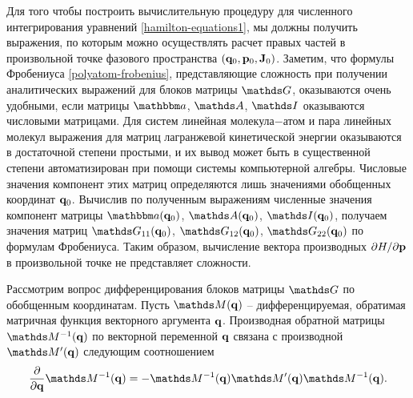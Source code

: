 Для того чтобы построить вычислительную процедуру для численного интегрирования уравнений \eqref{hamilton-equations1}, мы должны получить выражения, по которым можно осуществлять расчет правых частей в произвольной точке фазового пространства $\left( \mathbf{q}_0, \mathbf{p}_0, \mathbf{J}_0 \right)$. Заметим, что формулы Фробениуса \eqref{polyatom-frobenius}, представляющие сложность при получении аналитических выражений для блоков матрицы $\bbG$, оказываются очень удобными, если матрицы $\bba$, $\bbA$, $\bbI$ оказываются числовыми матрицами. Для систем линейная молекула$-$атом и пара линейных молекул выражения для матриц лагранжевой кинетической энергии оказываются в достаточной степени простыми, и их вывод может быть в существенной степени автоматизирован при помощи системы компьютерной алгебры. Числовые значения компонент этих матриц определяются лишь значениями обобщенных координат $\mathbf{q}_0$. Вычислив по полученным выражениям численные значения компонент матрицы $\bba(\mf{q}_0)$, $\bbA(\mf{q}_0)$, $\bbI(\mf{q}_0)$, получаем значения матриц $\bbG_{11}(\mf{q}_0)$, $\bbG_{12}(\mf{q}_0)$, $\bbG_{22}(\mf{q}_0)$ по формулам Фробениуса. Таким образом, вычисление вектора производных $\partial H / \partial \mathbf{p}$ в произвольной точке не представляет сложности. \par
Рассмотрим вопрос дифференцирования блоков матрицы $\bbG$ по обобщенным координатам. Пусть $\bbM(\mf{q})$ -- дифференцируемая, обратимая матричная функция векторного аргумента $\mathbf{q}$. Производная обратной матрицы $\bbM^{-1}(\mf{q})$ по векторной переменной $\mathbf{q}$ связана с производной $\bbM^\prime(\mf{q})$ следующим соотношением \cite{matrixcookbook}
\begin{gather}
    \frac{\partial}{\partial \mf{q}} \bbM^{-1}(\mf{q}) = - \bbM^{-1}(\mf{q}) \bbM^\prime(\mf{q}) \bbM^{-1}(\mf{q}).
\end{gather}

